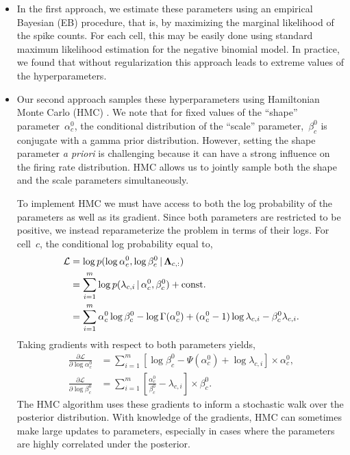 \begin{itemize}

\item In the first approach, we estimate these parameters using an
  empirical Bayesian (EB) procedure, that is, by maximizing the
  marginal likelihood of the spike counts.  For each cell, this may be
  easily done using standard maximum likelihood estimation for the
  negative binomial model.  In practice, we found that without
  regularization this approach leads to extreme values of the
  hyperparameters.

 

\item Our second approach samples these hyperparameters using
  Hamiltonian Monte Carlo (HMC) \citep{Neal10}. We note that for fixed
  values of the ``shape'' parameter~$\alpha_c^0$, the conditional
  distribution of the ``scale'' parameter,~$\beta_c^0$ is conjugate
  with a gamma prior distribution. However, setting the shape
  parameter \textit{a priori} is challenging because it can have a
  strong influence on the firing rate distribution. HMC allows us to
  jointly sample both the shape and the scale parameters
  simultaneously.

To implement HMC we must have access to both the log probability of
the parameters as well as its gradient. Since both parameters are
restricted to be positive, we instead reparameterize the problem in
terms of their logs. For cell~$c$, the conditional log probability
equal to,
\begin{align}
\mathcal{L} &= \log p(\log \alpha_c^0, \log \beta_c^0 \,|\, \boldsymbol{\Lambda}_{c,:}) \\
\nonumber &= \sum_{i=1}^m \log p(\lambda_{c,i} \,|\, \alpha_c^0, \beta_c^0) + \text{const.} \\
\nonumber &= \sum_{i=1}^m \alpha_c^0 \log \beta_c^0 - \log \Gamma(\alpha_c^0) + (\alpha_c^0 - 1) \log \lambda_{c,i} - \beta_c^0 \lambda_{c,i}.
\end{align}
Taking gradients with respect to both parameters yields,
\begin{align}
\frac{\partial \mathcal{L}}{\partial \log \alpha_c^0} &= \sum_{i=1}^m \left[ \log \beta_c^0 -\Psi(\alpha_c^0) + \log \lambda_{c,i} \right] \times \alpha_c^0, \\
\nonumber \frac{\partial \mathcal{L}}{\partial \log \beta_c^0} &= \sum_{i=1}^m \left[ \frac{\alpha_c^0}{\beta_c^0}  - \lambda_{c,i} \right] \times \beta_c^0.
\end{align}
The HMC algorithm uses these gradients to inform a stochastic walk
over the posterior distribution. With knowledge of the gradients, HMC
can sometimes make large updates to parameters, especially in cases
where the parameters are highly correlated under the posterior.



\end{itemize}
